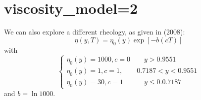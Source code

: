 \newpage
\section*{viscosity\_model=2}

We can also explore a different rheology, as given in \textcite{brhv08} (2008):
\[
\eta(y,T) = \eta_0(y) \exp [-b(cT)]
\]
with 
\[
\left\{
\begin{array}{c}
\eta_0(y)=1000, c=0 \qquad y> 0.9551 \\
\eta_0(y)=1,    c=1, \qquad  0.7187  <y< 0.9551 \\
\eta_0(y)=30,   c=1  \qquad\quad y \le 0.0.7187
\end{array}
\right.
\]
and $b=\ln 1000$.

